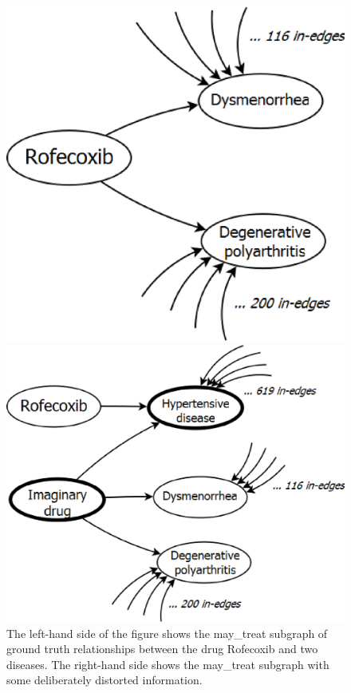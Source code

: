 \begin{figure}[tbh]
\begin{minipage}[c]{0.49\textwidth}\centering
\includegraphics[width=.7\textwidth]{fig/may_treat.eps}
\end{minipage}
\begin{minipage}[c]{0.49\textwidth}\centering
\includegraphics[width=.9\textwidth]{fig/may_treat_augmented.eps}
\end{minipage}
\caption[The may\_treat subgraph]{\label{fig:may_treat} The left-hand side of the figure shows the may\_treat subgraph of ground truth relationships between the drug Rofecoxib and two diseases. The right-hand side shows the may\_treat subgraph with some deliberately distorted information.}
\end{figure}

